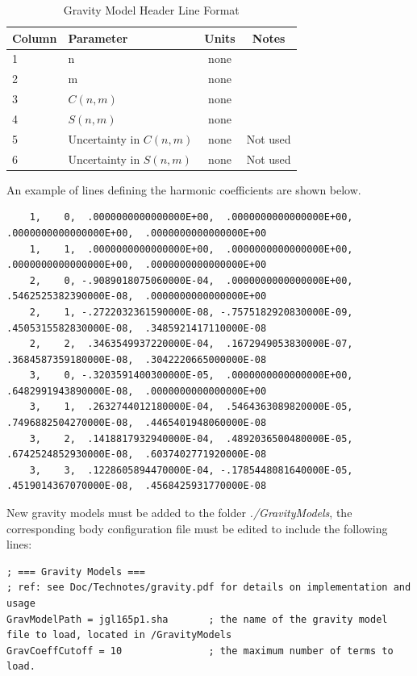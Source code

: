 \documentclass[Orbiter Technical Reference.tex]{subfiles}
\begin{document}
\begin{table}[h]
\begin{tabular}{llcc}
Column	&Parameter                        				&Units      			& Notes     \\\hline
1		&n                							&none        			&           \\
2		&m 								&none 			&           \\
3		&$C(n,m)$							&none           		&  \\
4		&$S(n,m)$ 							&none           		&		\\
5		&Uncertainty in $C(n,m)$	 				&none				&Not used		\\
6		&Uncertainty in $S(n,m)$					&none				&Not used	
\end{tabular}
\caption{Gravity Model Header Line Format}
\label{tab:coefflinefmat}
\end{table}



An example of lines defining the harmonic coefficients are shown below.
\begin{tiny}
\begin{verbatim}
    1,    0,  .0000000000000000E+00,  .0000000000000000E+00,  .0000000000000000E+00,  .0000000000000000E+00             
    1,    1,  .0000000000000000E+00,  .0000000000000000E+00,  .0000000000000000E+00,  .0000000000000000E+00             
    2,    0, -.9089018075060000E-04,  .0000000000000000E+00,  .5462525382390000E-08,  .0000000000000000E+00             
    2,    1, -.2722032361590000E-08, -.7575182920830000E-09,  .4505315582830000E-08,  .3485921417110000E-08             
    2,    2,  .3463549937220000E-04,  .1672949053830000E-07,  .3684587359180000E-08,  .3042220665000000E-08             
    3,    0, -.3203591400300000E-05,  .0000000000000000E+00,  .6482991943890000E-08,  .0000000000000000E+00             
    3,    1,  .2632744012180000E-04,  .5464363089820000E-05,  .7496882504270000E-08,  .4465401948060000E-08             
    3,    2,  .1418817932940000E-04,  .4892036500480000E-05,  .6742524852930000E-08,  .6037402771920000E-08             
    3,    3,  .1228605894470000E-04, -.1785448081640000E-05,  .4519014367070000E-08,  .4568425931770000E-08             
\end{verbatim}
\end{tiny}
New gravity models must be added to the folder \emph{./GravityModels}, the corresponding body configuration file must be edited to include the following lines:
\begin{tiny}
\begin{verbatim}
; === Gravity Models ===
; ref: see Doc/Technotes/gravity.pdf for details on implementation and usage
GravModelPath = jgl165p1.sha       ; the name of the gravity model file to load, located in /GravityModels
GravCoeffCutoff = 10               ; the maximum number of terms to load.
\end{verbatim}
\end{tiny}
\end{document}
